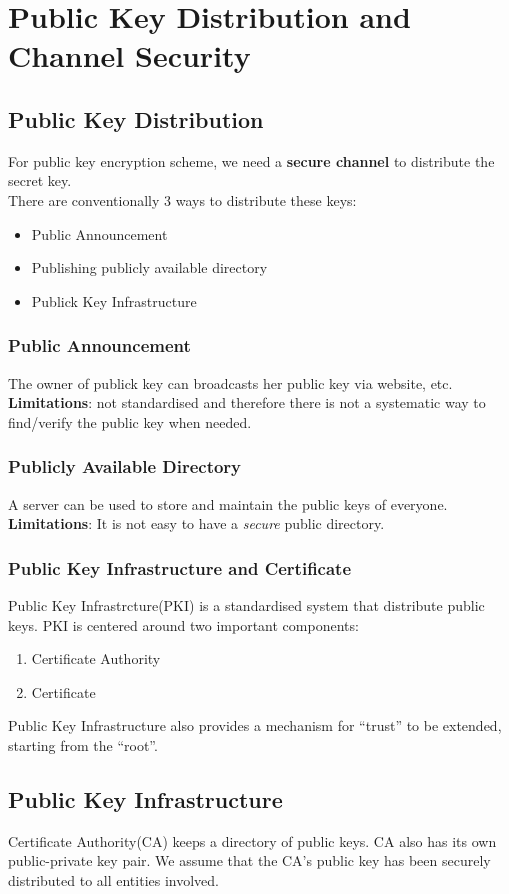\documentclass[12pt]{article}
\theoremstyle{definition}
\begin{document}
\section{Public Key Distribution and Channel Security}
\subsection{Public Key Distribution}
For public key encryption scheme, we need a \textbf{secure channel} to distribute the secret key.\\
There are conventionally 3 ways to distribute these keys:
\begin{itemize}
  \item Public Announcement
  \item Publishing publicly available directory
  \item Publick Key Infrastructure
\end{itemize}
\subsubsection{Public Announcement}
The owner of publick key can broadcasts her public key via website, etc.\\
\textbf{Limitations}: not standardised and therefore there is not a systematic way to find/verify the public key when needed.
\subsubsection{Publicly Available Directory}
A server can be used to store and maintain the public keys of everyone.\\
\textbf{Limitations}: It is not easy to have a \textit{secure} public directory.
\subsubsection{Public Key Infrastructure and Certificate}
Public Key Infrastrcture(PKI) is a standardised system that distribute public keys. PKI is centered around two important components:
\begin{enumerate}
  \item Certificate Authority
  \item Certificate
\end{enumerate}
Public Key Infrastructure also provides a mechanism for ``trust'' to be extended, starting from the ``root''.
\subsection{Public Key Infrastructure}
Certificate Authority(CA) keeps a directory of public keys. CA also has its own public-private key pair. We assume that the CA's public key has been securely distributed to all entities involved.
\end{document}
